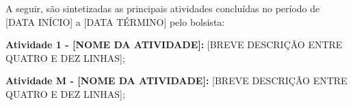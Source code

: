 \documentclass[../Main.tex]{subfiles}
\begin{document}
    A seguir, são sintetizadas as principais atividades concluídas no período de [DATA INÍCIO] a [DATA TÉRMINO] pelo bolsista:
    
    \textbf{Atividade 1 - [NOME DA ATIVIDADE]: } [BREVE DESCRIÇÃO ENTRE QUATRO E DEZ LINHAS]; 

    \textbf{Atividade M - [NOME DA ATIVIDADE]: } [BREVE DESCRIÇÃO ENTRE QUATRO E DEZ LINHAS]; 
\end{document}
